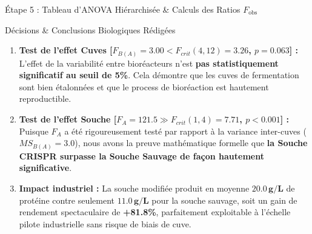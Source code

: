 \documentclass[11pt,a4paper]{article}
\begin{document}
\begin{stepbox}{Étape 5 : Tableau d'ANOVA Hiérarchisée \& Calculs des Ratios $F_{\text{obs}}$}
\begin{center}
\end{center}
\end{stepbox}

\begin{takeawaybox}{Décisions \& Conclusions Biologiques Rédigées}
\begin{enumerate}[leftmargin=*, label=\faCheckCircle\ \textbf{\arabic*.}]
  \item \textbf{Test de l'effet Cuves [$F_{B(A)} = 3.00 < F_{crit}(4, 12) = 3.26$, $p = 0.063$] :}
  L'effet de la variabilité entre bioréacteurs n'est \textbf{pas statistiquement significatif au seuil de 5\%}. Cela démontre que les cuves de fermentation sont bien étalonnées et que le process de bioréaction est hautement reproductible.
  \item \textbf{Test de l'effet Souche [$F_A = 121.5 \gg F_{crit}(1, 4) = 7.71$, $p < 0.001$] :}
  Puisque $F_A$ a été rigoureusement testé par rapport à la variance inter-cuves ($MS_{B(A)} = 3.0$), nous avons la preuve mathématique formelle que \textbf{la Souche CRISPR surpasse la Souche Sauvage de façon hautement significative}.
  \item \textbf{Impact industriel :} La souche modifiée produit en moyenne $\mathbf{20.0\,\text{g/L}}$ de protéine contre seulement $\mathbf{11.0\,\text{g/L}}$ pour la souche sauvage, soit un gain de rendement spectaculaire de \textbf{+81.8\%}, parfaitement exploitable à l'échelle pilote industrielle sans risque de biais de cuve.
\end{enumerate}
\end{takeawaybox}
\end{document}

